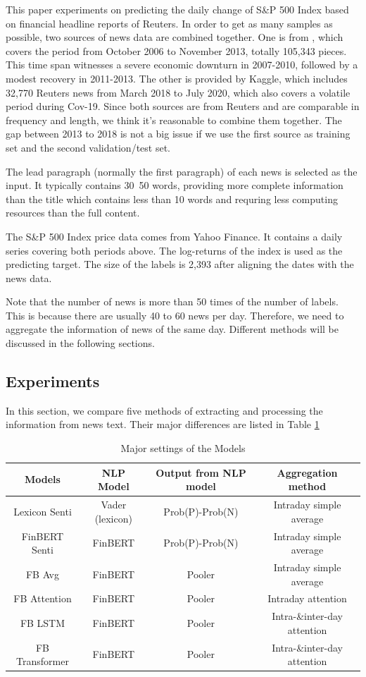 \documentclass[11pt]{article}
\begin{document}
This paper experiments on predicting the daily change of S\&P 500 Index based on financial headline reports of Reuters. In order to get as many samples as possible, two sources of news data are combined together. One is from \citet{ding-etal-2014-using}, which covers the period from October 2006 to November 2013, totally 105,343 pieces. This time span witnesses a severe economic downturn in 2007-2010, followed by a modest recovery in 2011-2013. The other is provided by Kaggle, which includes 32,770 Reuters news from March 2018 to July 2020, which also covers a volatile period during Cov-19. Since both sources are from Reuters and are comparable in frequency and length, we think it's reasonable to combine them together. The gap between 2013 to 2018 is not a big issue if we use the first source as training set and the second validation/test set. 

The lead paragraph (normally the first paragraph) of each news is selected as the input. It typically contains 30~50 words, providing more complete information than the title which contains less than 10 words and requring less computing resources than the full content.

The S\&P 500 Index price data comes from Yahoo Finance. It contains a daily series covering both periods above. The log-returns of the index is used as the predicting target. The size of the labels is 2,393 after aligning the dates with the news data. 

Note that the number of news is more than 50 times of the number of labels. This is because there are usually 40 to 60 news per day. Therefore, we need to aggregate the information of news of the same day. Different methods will be discussed in the following sections. 

\subsection{Experiments}

In this section, we compare five methods of extracting and processing the information from news text. Their major differences are listed in Table \ref{tab:experiment_details}

\begin{table}[t]
  \centering
  \begin{tabular}{|c|c|c|c|}
  \hline
  Models & NLP Model & Output from NLP model & Aggregation method \\
  \hline
  Lexicon Senti & Vader (lexicon) & Prob(P)-Prob(N) & Intraday simple average \\
  FinBERT Senti & FinBERT & Prob(P)-Prob(N) & Intraday simple average \\
  FB Avg & FinBERT & Pooler & Intraday simple average \\
  FB Attention & FinBERT & Pooler & Intraday attention\\
  FB LSTM & FinBERT & Pooler &  Intra-\&inter-day attention\\
  FB Transformer & FinBERT & Pooler &  Intra-\&inter-day attention\\
  \hline
  \end{tabular}
  \caption{Major settings of the Models}
  \label{tab:experiment_details}
\end{table}
\end{document}
